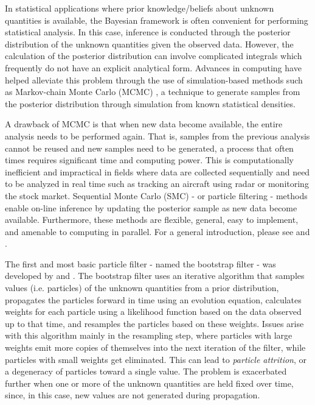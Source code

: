 \documentclass{elsarticle}
\begin{document}
In statistical applications where prior knowledge/beliefs about unknown quantities is available, the Bayesian framework is often convenient for performing statistical analysis.  In this case, inference is conducted through the posterior distribution of the unknown quantities given the observed data. However, the calculation of the posterior distribution can involve complicated integrals which frequently do not have an explicit analytical form. Advances in computing have helped alleviate this problem through the use of simulation-based methods such as Markov-chain Monte Carlo (MCMC) \citep{Gelf:Smit:samp:1990}, a technique to generate samples from the posterior distribution through simulation from known statistical densities.

A drawback of MCMC is that when new data become available, the entire analysis needs to be performed again. That is, samples from the previous analysis cannot be reused and new samples need to be generated, a process that often times requires significant time and computing power. This is computationally inefficient and impractical in fields where data are collected sequentially and need to be analyzed in real time such as tracking an aircraft using radar or monitoring the stock market. Sequential Monte Carlo (SMC) - or particle filtering - methods enable on-line inference by updating the posterior sample as new data become available. Furthermore, these methods are flexible, general, easy to implement, and amenable to computing in parallel. For a general introduction, please see \cite{Douc:deFr:Gord:sequ:2001} and \cite{cappe2007overview}.

The first and most basic particle filter - named the bootstrap filter - was developed by \citet{Gord:Salm:Smit:nove:1993} and \citet{Kita:mont:1996}. The bootstrap filter uses an iterative algorithm that samples values (i.e. particles) of the unknown quantities from a prior distribution, propagates the particles forward in time using an evolution equation, calculates weights for each particle using a likelihood function based on the data observed up to that time, and resamples the particles based on these weights. Issues arise with this algorithm mainly in the resampling step, where particles with large weights emit more copies of themselves into the next iteration of the filter, while particles with small weights get eliminated. This can lead to \emph{particle attrition}, or a degeneracy of particles toward a single value. The problem is exacerbated further when one or more of the unknown quantities are held fixed over time, since, in this case, new values are not generated during propagation.
\end{document}
